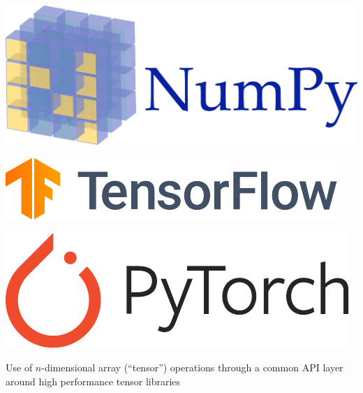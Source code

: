 \documentclass[a0,portrait]{a0poster}
\begin{document}
\begin{multicols}{2}
 \vspace{1cm}
 \begin{minipage}{0.33\linewidth}
  \begin{center}
   \includegraphics[width=\linewidth]{NumPy_logo.pdf}
  \end{center}
 \end{minipage}%
 \quad
 \begin{minipage}{0.33\linewidth}
  \begin{center}
   \includegraphics[width=\linewidth]{TensorFlow_logo.pdf}
  \end{center}
 \end{minipage}%
 \quad
 \begin{minipage}{0.33\linewidth}
  \begin{center}
   \includegraphics[width=0.85\linewidth]{Pytorch_logo.pdf}
  \end{center}
 \end{minipage}%
 \vspace{1cm}

 \noindent Use of $n$-dimensional array (``tensor'') operations through a common API layer around high performance tensor libraries



\end{multicols}
\end{document}

